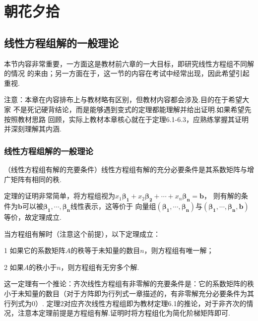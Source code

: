 \chapter{朝花夕拾}

\section{线性方程组解的一般理论}
本节内容非常重要，一方面这是教材前六章的一大目标，即研究线性方程组不同解的情况
的来由；另一方面在于，这一节的内容在考试中经常出现，因此希望引起重视.

注意：本章在内容排布上与教材略有区别，但教材内容都会涉及.目的在于希望大家
不是死记硬背结论，而是能够遇到变式的定理都能理解并给出证明.如果希望先按照教材思路
回顾，实际上教材本章核心就在于定理6.1-6.3，应熟练掌握其证明并深刻理解其内涵.
\subsection{线性方程组解的一般理论}
\begin{theorem}
	（线性方程组有解的充要条件）线性方程组有解的充分必要条件是其系数矩阵与增广矩阵有相同的秩.
\end{theorem}
定理的证明非常简单，将方程组视为$x_1\bm{\beta_1}+x_2\bm{\beta_2}+\cdots+x_n\bm{\beta_n}=\bm{b}$，
则有解的条件为$\bm{b}$可以被$\bm{\beta_1},\cdots,\bm{\beta_n}$线性表示，这等价于
向量组$(\bm{\beta_1},\cdots,\bm{\beta_n})$与$(\bm{\beta_1},\cdots,\bm{\beta_n},\bm{b})$等价，故定理成立.

\begin{theorem}
	当方程组有解时（注意这个前提），以下定理成立：

	\textup{1} 如果它的系数矩阵$A$的秩等于未知量的数目$n$，则方程组有唯一解；
	
	\textup{2} 如果$A$的秩小于$n$，则方程组有无穷多个解.
\end{theorem}
这一定理有一个推论：齐次线性方程组有非零解的充要条件是：它的系数矩阵的秩小于未知量的数目（对于方阵即为行列式一章描述的，有非零解充分必要条件为其行列式为0）.
定理2对应齐次线性方程组即为教材定理6.1的推论，对于非齐次的情况，注意本定理前提是方程组有解.证明时将方程组化为简化阶梯矩阵即可.
